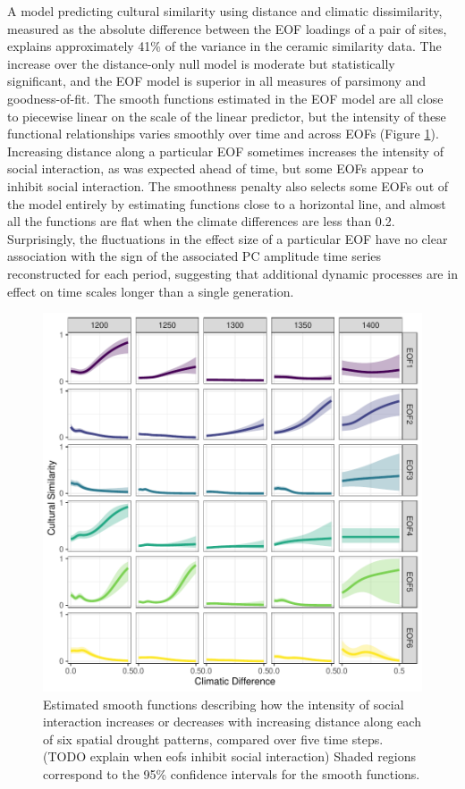 \documentclass[10pt]{iopart}
\begin{document}
A model predicting cultural similarity using distance and climatic dissimilarity, measured as the absolute difference between the EOF loadings of a pair of sites, explains approximately 41\% of the variance in the ceramic similarity data. The increase over the distance-only null model is moderate but statistically significant, and the EOF model is superior in all measures of parsimony and goodness-of-fit. The smooth functions estimated in the EOF model are all close to piecewise linear on the scale of the linear predictor, but the intensity of these functional relationships varies smoothly over time and across EOFs (Figure \ref{fig:smooths}). Increasing distance along a particular EOF sometimes increases the intensity of social interaction, as was expected ahead of time, but some EOFs appear to inhibit social interaction. The smoothness penalty also selects some EOFs out of the model entirely by estimating functions close to a horizontal line, and almost all the functions are flat when the climate differences are less than 0.2. Surprisingly, the fluctuations in the effect size of a particular EOF have no clear association with the sign of the associated PC amplitude time series reconstructed for each period, suggesting that additional dynamic processes are in effect on time scales longer than a single generation. 


\begin{figure}[!htbp]
\centering
\includegraphics[width=.9\linewidth]{figures/smooths.pdf}
\caption{Estimated smooth functions describing how the intensity of social interaction increases or decreases with increasing distance along each of six spatial drought patterns, compared over five time steps. (TODO explain when eofs inhibit social interaction) Shaded regions correspond to the 95\% confidence intervals for the smooth functions.}
\label{fig:smooths}
\end{figure}
\end{document}
